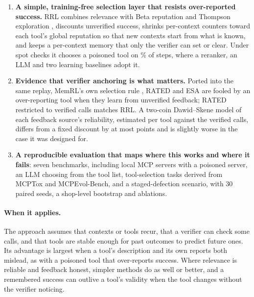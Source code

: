 \documentclass[11pt]{article}
\begin{document}
\begin{enumerate}
  \item \textbf{A simple, training-free selection layer that resists over-reported success.} RRL combines
  relevance with Beta reputation \citep{josang2002} and Thompson exploration
  \citep{thompson1933}, discounts unverified success, shrinks per-context counters toward each
  tool's global reputation so that new contexts start from what is known, and keeps a
  per-context memory that only the verifier can set or clear. Under spot checks it chooses a
  poisoned tool on \MspotPoisonRRL\% of steps, where a reranker, an LLM and two learning baselines
  adopt it.
  \item \textbf{Evidence that verifier anchoring is what matters.} Ported into the same replay,
  MemRL's own selection rule \citep{memrl}, RATED \citep{rated} and ESA \citep{esa} are fooled by
  an over-reporting tool when they learn from unverified feedback; RATED restricted to verified
  calls matches RRL. A two-coin Dawid--Skene \citep{dawid1979} model of each feedback source's
  reliability, estimated per tool against the verified calls, differs from a fixed discount by at
  most \TrustMaxAbs{} points and is slightly worse in the case it was designed for.
  \item \textbf{A reproducible evaluation that maps where this works and where it fails}: seven
  benchmarks, including local MCP servers with a poisoned server, an LLM choosing from the tool
  list, tool-selection tasks derived from MCPTox and MCPEvol-Bench, and a staged-defection
  scenario, with 30 paired seeds, a shop-level bootstrap and ablations.
\end{enumerate}

\paragraph{When it applies.} The approach assumes that contexts or tools recur, that a
verifier can check some calls, and that tools are stable enough for past outcomes to predict
future ones. Its advantage is largest when a tool's description and its own reports both
mislead, as with a poisoned tool that over-reports success. Where relevance is reliable and
feedback honest, simpler methods do as well or better, and a remembered success can outlive a
tool's validity when the tool changes without the verifier noticing.
\end{document}

